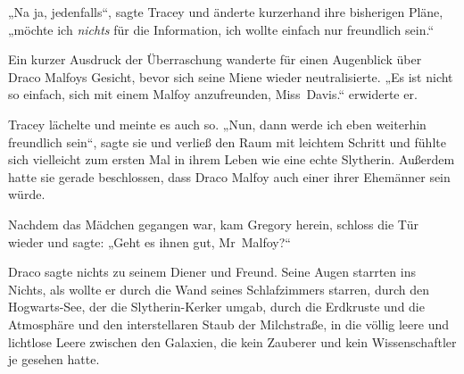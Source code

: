 „Na ja, jedenfalls“, sagte Tracey und änderte kurzerhand ihre bisherigen Pläne, „möchte ich \emph{nichts} für die Information, ich wollte einfach nur freundlich sein.“

Ein kurzer Ausdruck der Überraschung wanderte für einen Augenblick über Draco Malfoys Gesicht, bevor sich seine Miene wieder neutralisierte.
„Es ist nicht so einfach, sich mit einem Malfoy anzufreunden, Miss~Davis.“ erwiderte er.

Tracey lächelte und meinte es auch so.
„Nun, dann werde ich eben weiterhin freundlich sein“, sagte sie und verließ den Raum mit leichtem Schritt und fühlte sich vielleicht zum ersten Mal in ihrem Leben wie eine echte Slytherin. Außerdem hatte sie gerade beschlossen, dass Draco Malfoy auch einer ihrer Ehemänner sein würde.

\later

Nachdem das Mädchen gegangen war, kam Gregory herein, schloss die Tür wieder und sagte:
„Geht es ihnen gut, Mr~Malfoy?“

Draco sagte nichts zu seinem Diener und Freund. Seine Augen starrten ins Nichts, als wollte er durch die Wand seines Schlafzimmers starren, durch den Hogwarts-See, der die Slytherin-Kerker umgab, durch die Erdkruste und die Atmosphäre und den interstellaren Staub der Milchstraße, in die völlig leere und lichtlose Leere zwischen den Galaxien, die kein Zauberer und kein Wissenschaftler je gesehen hatte.

